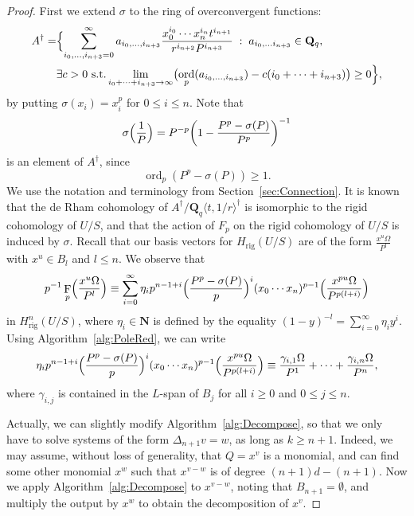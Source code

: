 \documentclass[a4paper,11pt]{article}
\numberwithin{equation}{section}
\newcommand{\NN}{\mathbf{N}} %
\newcommand{\QQ}{\mathbf{Q}} %
\DeclareMathOperator{\ord}{ord}          %
\DeclareMathOperator{\Frob}{F}           %
\providecommand{\Hrig}{H_{\text{rig}}}  %
\theoremstyle{definition}
\begin{document}
\begin{proof}
First we extend $\sigma$ to the ring of overconvergent functions:
\begin{align*}
A^{\dag} =
&\Bigl\{ \sum_{i_0,\dotsc,i_{n+3}=0}^{\infty} a_{i_0, \dotsc, i_{n+3}} 
\frac{x_0^{i_0} \dotsm x_n^{i_{n}}t^{i_{n+1}}}{r^{i_{n+2}} P^{i_{n+3}}} \; : \;
a_{i_0, \dotsc i_{n+3}} \in \QQ_q, \; \\ 
&\exists c > 0 \text{ s.t.} \lim_{i_0+\dotsb+i_{n+3} \rightarrow \infty} \bigl(\ord_p(a_{i_0, \dotsc, i_{n+3}} ) - 
c(i_0+\dotsb+i_{n+3})\bigr) \geq 0 \Bigr\},
\end{align*}
by putting $\sigma(x_i) = x_i^p$ for $0 \leq i \leq n$. Note that
\begin{equation*}
\sigma\Bigl(\frac{1}{P}\Bigr) = 
    P^{-p} \biggl( 1-\frac{P^p-\sigma(P)}{P^p} \biggr)^{-1}
\end{equation*}
is an element of $A^{\dag}$, since 
\begin{equation*}
\ord_p(P^p-\sigma(P)) \geq 1.
\end{equation*}
We use the notation and terminology from Section~\ref{sec:Connection}.
It is known that the de Rham cohomology of 
$A^{\dag}/\QQ_q \langle t,1/r \rangle^{\dag}$ 
is isomorphic to the rigid cohomology of $U/S$, and that the action of 
$F_p$ on the rigid cohomology of $U/S$ is induced by $\sigma$. Recall
that our basis vectors for $\Hrig(U/S)$ %
are of the form $\frac{x^u \Omega}{P^{l}}$ with $x^u \in B_l$ and $l \leq n$. 
We observe that
\begin{equation*}
p^{-1} \Frob_p \Bigl(\frac{x^u \Omega}{P^{l}} \Bigr) \equiv
\sum_{i=0}^{\infty} \eta_i p^{n-1+i} \Bigl(\frac{P^p-\sigma(P)}{p} \Bigr)^i 
(x_0 \dotsm x_n)^{p-1} \Bigl( \frac{x^{pu} \Omega}{P^{p(l+i)}} \Bigr)
\end{equation*}
in $\Hrig^n(U/S)$, where $\eta_i \in \NN$ is defined by the equality 
$(1-y)^{-l} = \sum_{i=0}^{\infty} \eta_i y^i$.
Using Algorithm~\ref{alg:PoleRed}, we can write
\begin{equation} \label{eqn:Froblift}
\eta_i p^{n-1+i} \Bigl(\frac{P^p-\sigma(P)}{p} \Bigr)^i 
(x_0 \dotsm x_n)^{p-1} \Bigl( \frac{x^{pu} \Omega}{P^{p(l+i)}} \Bigr) \equiv
\frac{\gamma_{i,1} \Omega}{P^1}+\dotsb+\frac{\gamma_{i,n} \Omega}{P^n},
\end{equation}
where $\gamma_{i,j}$ is contained in the $L$-span of $B_j$ for all $i \geq 0$ and 
$0 \leq j \leq n$. 

Actually, we can slightly modify 
Algorithm~\ref{alg:Decompose}, so that we only have to solve systems of the 
form $\Delta_{n+1} v = w$, as long as $k \geq n+1$. Indeed, we may assume, 
without loss of generality, that $Q=x^v$ is a monomial, and can find some 
other monomial $x^w$ such that $x^{v-w}$ is of degree $(n+1)d-(n+1)$. Now we 
apply Algorithm~\ref{alg:Decompose} to $x^{v-w}$, noting that $B_{n+1}=\emptyset$, 
and multiply the output by $x^w$ to obtain the decomposition of $x^v$. 


\end{proof}
\end{document}
